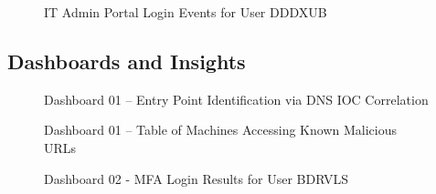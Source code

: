 \documentclass[11pt]{article}
\begin{document}
	\begin{figure}[h]
		\centering
		\caption{IT Admin Portal Login Events for User DDDXUB}
		\label{fig: A29}
	\end{figure}

\FloatBarrier
\subsection{Dashboards and Insights}
	\renewcommand{\thefigure}{B\arabic{figure}}
	\setcounter{figure}{0}
	\begin{figure}[h]
		\centering
		\caption{Dashboard 01 – Entry Point Identification via DNS IOC Correlation}
		\label{fig: B1}
	\end{figure}
	
	\begin{figure}[h]
		\centering
		\caption{Dashboard 01 – Table of Machines Accessing Known Malicious URLs}
		\label{fig: B2}
	\end{figure}
	
	\begin{figure}[H]
		\centering
		\caption{Dashboard 02 - MFA Login Results for User BDRVLS}
		\label{fig: B3}
	\end{figure}
	
\end{document}
